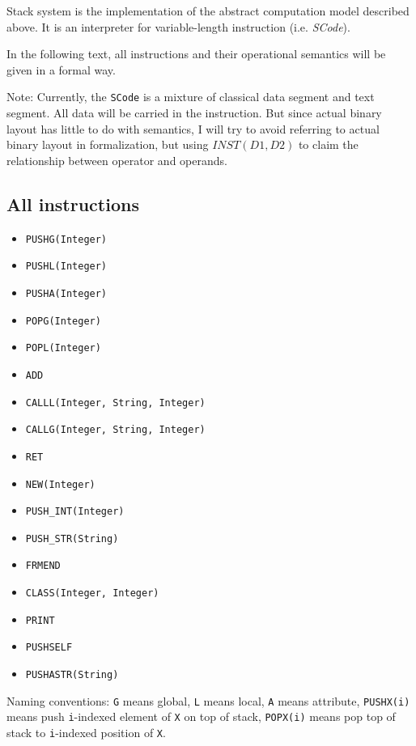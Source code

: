 \documentclass[]{article}
\numberwithin{equation}{section}
\numberwithin{figure}{section}
\numberwithin{table}{section}
\begin{document}
Stack system is the implementation of the abstract computation model
described above. It is an interpreter for variable-length instruction
(i.e. \emph{SCode}).

In the following text, all instructions and their operational semantics
will be given in a formal way.

Note: Currently, the \texttt{SCode} is a mixture of classical data
segment and text segment. All data will be carried in the instruction.
But since actual binary layout has little to do with semantics, I will
try to avoid referring to actual binary layout in formalization, but
using $INST(D1, D2)$ to claim the relationship between operator and
operands.

\subsection{All instructions}\label{all-instructions}

\begin{itemize}
\itemsep1pt\parskip0pt
\item
  \texttt{PUSHG(Integer)}
\item
  \texttt{PUSHL(Integer)}
\item
  \texttt{PUSHA(Integer)}
\item
  \texttt{POPG(Integer)}
\item
  \texttt{POPL(Integer)}
\item
  \texttt{ADD}
\item
  \texttt{CALLL(Integer, String, Integer)}
\item
  \texttt{CALLG(Integer, String, Integer)}
\item
  \texttt{RET}
\item
  \texttt{NEW(Integer)}
\item
  \texttt{PUSH\_INT(Integer)}
\item
  \texttt{PUSH\_STR(String)}
\item
  \texttt{FRMEND}
\item
  \texttt{CLASS(Integer, Integer)}
\item
  \texttt{PRINT}
\item
  \texttt{PUSHSELF}
\item
  \texttt{PUSHASTR(String)}
\end{itemize}

Naming conventions: \texttt{G} means global, \texttt{L} means local,
\texttt{A} means attribute, \texttt{PUSHX(i)} means push
\texttt{i}-indexed element of \texttt{X} on top of stack,
\texttt{POPX(i)} means pop top of stack to \texttt{i}-indexed position
of \texttt{X}.
\end{document}
